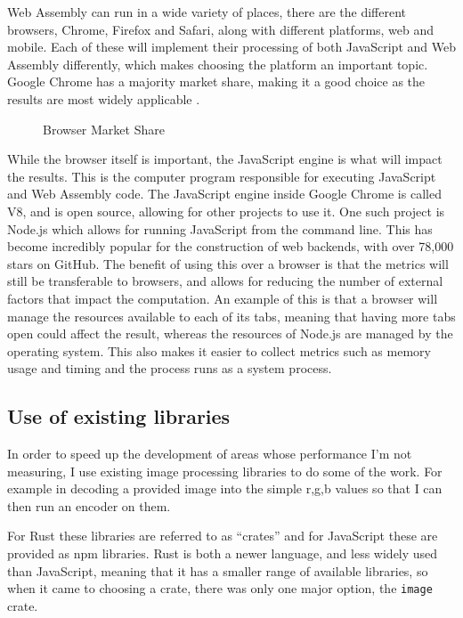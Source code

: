 \documentclass[12pt,a4paper]{article}
\begin{document}
Web Assembly can run in a wide variety of places, there are the different browsers, Chrome, Firefox and Safari, along with different platforms, web and mobile. Each of these will implement their processing of both JavaScript and Web Assembly differently, which makes choosing the platform an important topic. Google Chrome has a majority market share, making it a good choice as the results are most widely applicable \cite{webmarketshare}.
\begin{figure}[H]
    \centering
    \caption{Browser Market Share}

\end{figure}
While the browser itself is important, the JavaScript engine is what will impact the results. This is the computer program responsible for executing JavaScript and Web Assembly code. The JavaScript engine inside Google Chrome is called V8, and is open source, allowing for other projects to use it. One such project is Node.js which allows for running JavaScript from the command line. This has become incredibly popular for the construction of web backends, with over 78,000 stars on GitHub. The benefit of using this over a browser is that the metrics will still be transferable to browsers, and allows for reducing the number of external factors that impact the computation. An example of this is that a browser will manage the resources available to each of its tabs, meaning that having more tabs open could affect the result, whereas the resources of Node.js are managed by the operating system. This also makes it easier to collect metrics such as memory usage and timing and the process runs as a system process.

\subsection{Use of existing libraries}

In order to speed up the development of areas whose performance I'm not measuring, I use existing image processing libraries to do some of the work. For example in decoding a provided image into the simple r,g,b values so that I can then run an encoder on them.

For Rust these libraries are referred to as “crates” and for JavaScript these are provided as npm libraries. Rust is both a newer language, and less widely used than JavaScript, meaning that it has a smaller range of available libraries, so when it came to choosing a crate, there was only one major option, the \texttt{image} crate.
\end{document}
